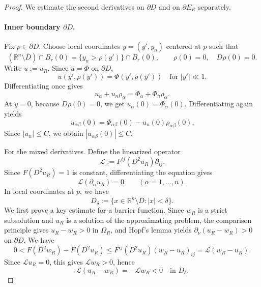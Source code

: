 \documentclass[10pt,a4paper]{amsart}
\begin{document}
	\begin{proof}
		We estimate the second derivatives on $\partial D$ and on $\partial E_R$ separately.
		
		\paragraph{Inner boundary $\partial D$.}
		Fix $p \in \partial D$. Choose local coordinates $y = (y', y_n)$ centered at $p$ such that
		\[
		(\mathbb{R}^n \setminus \overline{D}) \cap B_r(0) = \{ y_n > \rho(y') \} \cap B_r(0), \qquad \rho(0) = 0, \quad D\rho(0) = 0.
		\]
		Write $u := u_R$. Since $u = \Phi$ on $\partial D$,
		\[
		u(y', \rho(y')) = \Phi(y', \rho(y')) \quad \text{for } |y'| \ll 1.
		\]
		Differentiating once gives
		\[
		u_\alpha + u_n \rho_\alpha = \Phi_\alpha + \Phi_n \rho_\alpha.
		\]
		At $y=0$, because $D\rho(0)=0$, we get $u_\alpha(0) = \Phi_\alpha(0)$. Differentiating again yields
		\[
		u_{\alpha\beta}(0) = \Phi_{\alpha\beta}(0) - u_n(0)\rho_{\alpha\beta}(0).
		\]
		Since $|u_n| \le C$, we obtain $|u_{\alpha\beta}(0)| \le C$.
		
		
		For the mixed derivatives.
		Define the linearized operator
		\begin{equation}
			\mathcal{L} := F^{ij}(D^2 u_R)\partial_{ij}. \label{eq:L_mixed}
		\end{equation}
		Since $F(D^2 u_R)=1$ is constant, differentiating the equation gives
		\begin{equation}
			\mathcal{L}(\partial_\alpha u_R)=0 \qquad (\alpha=1,\dots,n). \label{eq:Lder_mixed}
		\end{equation}
		In local coordinates at $p$, we have
		$$D_\delta := \{ x \in \mathbb{R}^n \setminus \overline{D} : |x| < \delta \}.$$
		We first prove a key estimate for a barrier function. 
		Since $w_R$ is a strict subsolution and $u_R$ is a solution of the approximating problem, 
		the comparison principle gives $u_R-w_R>0$ in $\Omega_R$, and Hopf's lemma yields 
		$\partial_\nu(u_R-w_R)>0$ on $\partial D$. 
		We have
		\begin{equation}
			0<F(D^2w_R)-F(D^2u_R)
			\le F^{ij}(D^2u_R)(w_R-u_R)_{ij}
			= \mathcal{L}(w_R-u_R). \label{eq:concavity_zeta_mixed}
		\end{equation}
		Since $\mathcal{L}u_R=0$, this gives $\mathcal{L}w_R>0$, hence
		\begin{equation}
			\mathcal{L}(u_R-w_R)=-\mathcal{L}w_R<0 \quad \text{in } D_\delta. \label{eq:Luw_zeta_mixed}
		\end{equation}
		

\end{proof}
\end{document}
